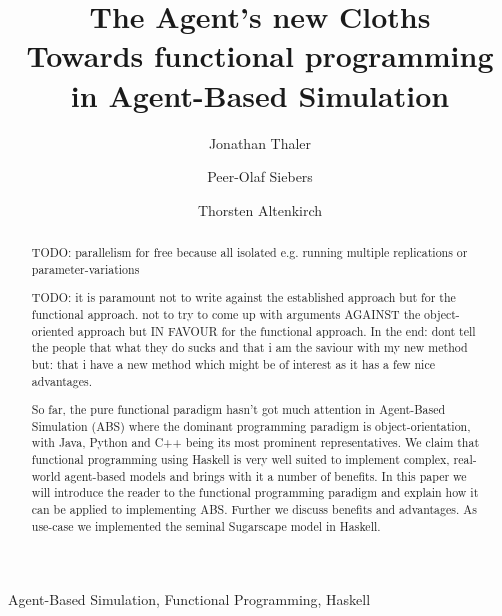 \documentclass{JASSS}
\title{The Agent's new Cloths \\ {\large Towards functional programming in Agent-Based Simulation}}
\author[1]{Jonathan Thaler}
\author[1]{Peer-Olaf Siebers}
\author[1]{Thorsten Altenkirch}
\affil[1]{University of Nottingham, 7301 Wollaton Rd, Nottingham, NG8 1BB, United Kingdom}
\begin{document}
\maketitle 



\begin{abstract}
TODO: parallelism for free because all isolated e.g. running multiple replications or parameter-variations

TODO: it is paramount not to write against the established approach but for the functional approach. not to try to come up with arguments AGAINST the object-oriented approach but IN FAVOUR for the functional approach. In the end: dont tell the people that what they do sucks and that i am the saviour with my new method but: that i have a new method which might be of interest as it has a few nice advantages.

So far, the pure functional paradigm hasn't got much attention in Agent-Based Simulation (ABS) where the dominant programming paradigm is object-orientation, with Java, Python and C++ being its most prominent representatives. We claim that functional programming using Haskell is very well suited to implement complex, real-world agent-based models and brings with it a number of benefits. In this paper we will introduce the reader to the functional programming paradigm and explain how it can be applied to implementing ABS. Further we discuss benefits and advantages. As use-case we implemented the seminal Sugarscape model in Haskell.
\end{abstract}

\begin{keywords}
Agent-Based Simulation, Functional Programming, Haskell
\end{keywords}

\parano{}












\end{document}
